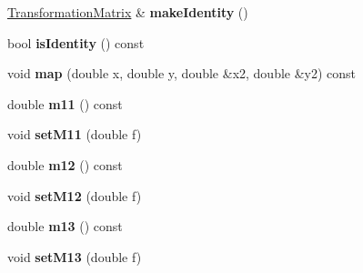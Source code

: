 \begin{DoxyCompactItemize}
\mbox{\label{class_web_core_1_1_transformation_matrix_a6adf56457f7544d2d522e1e20e0c6dac}} 
\mbox{\hyperlink{class_web_core_1_1_transformation_matrix}{Transformation\+Matrix}} \& {\bfseries make\+Identity} ()
\item 
\mbox{\label{class_web_core_1_1_transformation_matrix_ad792cfd21ca75d6f23852985b9859f39}} 
bool {\bfseries is\+Identity} () const
\item 
\mbox{\label{class_web_core_1_1_transformation_matrix_ae20cbdcf66baf2e71c3ddf3d95924276}} 
void {\bfseries map} (double x, double y, double \&x2, double \&y2) const
\item 
\mbox{\label{class_web_core_1_1_transformation_matrix_a865e9de02ea5a99bc9b5885b529fbd84}} 
double {\bfseries m11} () const
\item 
\mbox{\label{class_web_core_1_1_transformation_matrix_a9d5ac993f6632a9434f7b2bf6dd1140e}} 
void {\bfseries set\+M11} (double f)
\item 
\mbox{\label{class_web_core_1_1_transformation_matrix_ac348614f9d5b35c667e3b33b40399a3a}} 
double {\bfseries m12} () const
\item 
\mbox{\label{class_web_core_1_1_transformation_matrix_a819bd6c355f2af21e43bd5f19416fb70}} 
void {\bfseries set\+M12} (double f)
\item 
\mbox{\label{class_web_core_1_1_transformation_matrix_ad8df87dd74fef70f005075fcc8bc5379}} 
double {\bfseries m13} () const
\item 
\mbox{\label{class_web_core_1_1_transformation_matrix_a13aff514de5bfb1224a3a367ef6f0e22}} 
void {\bfseries set\+M13} (double f)
\item 
\mbox{\label{class_web_core_1_1_transformation_matrix_abbbbfa9bcf3c73ee80ad68a6757457d6}} 

\end{DoxyCompactItemize}
